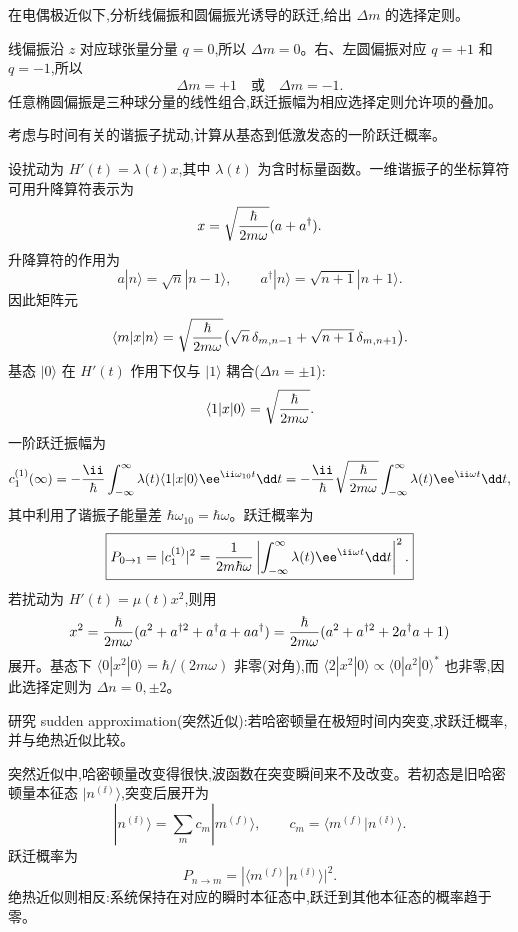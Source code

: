 \begin{question}
在电偶极近似下,分析线偏振和圆偏振光诱导的跃迁,给出 $\Delta m$ 的选择定则。
\end{question}
\begin{solution}
线偏振沿 $z$ 对应球张量分量 $q=0$,所以 $\Delta m=0$。右、左圆偏振对应 $q=+1$ 和 $q=-1$,所以
\[
\Delta m=+1\quad\text{或}\quad \Delta m=-1.
\]
任意椭圆偏振是三种球分量的线性组合,跃迁振幅为相应选择定则允许项的叠加。
\end{solution}

\begin{question}
考虑与时间有关的谐振子扰动,计算从基态到低激发态的一阶跃迁概率。
\end{question}
\begin{solution}
设扰动为 $H'(t)=\lambda(t)x$,其中 $\lambda(t)$ 为含时标量函数。一维谐振子的坐标算符可用升降算符表示为
\[
x=\sqrt{\hbar\over2m\omega}(a+a^\dagger).
\]
升降算符的作用为
\[
a|n\rangle=\sqrt{n}|n-1\rangle,\qquad
a^\dagger|n\rangle=\sqrt{n+1}|n+1\rangle.
\]
因此矩阵元
\[
\langle m|x|n\rangle=\sqrt{\hbar\over2m\omega}
\big(\sqrt{n}\,\delta_{m,n-1}+\sqrt{n+1}\,\delta_{m,n+1}\big).
\]
基态 $|0\rangle$ 在 $H'(t)$ 作用下仅与 $|1\rangle$ 耦合($\Delta n=\pm1$):
\[
\langle1|x|0\rangle=\sqrt{\hbar\over2m\omega}.
\]
一阶跃迁振幅为
\[
c_1^{(1)}(\infty)=-{\ii\over\hbar}\int_{-\infty}^{\infty}\lambda(t)
\langle1|x|0\rangle \ee^{\ii\omega_{10}t}\dd t
=-{\ii\over\hbar}\sqrt{\hbar\over2m\omega}\int_{-\infty}^{\infty}\lambda(t)\ee^{\ii\omega t}\dd t,
\]
其中利用了谐振子能量差 $\hbar\omega_{10}=\hbar\omega$。跃迁概率为
\[
\boxed{P_{0\to1}=|c_1^{(1)}|^2
= {1\over2m\hbar\omega}\left|\int_{-\infty}^{\infty}\lambda(t)\ee^{\ii\omega t}\dd t\right|^2.}
\]
若扰动为 $H'(t)=\mu(t)x^2$,则用
\[
x^2={\hbar\over2m\omega}(a^2+a^{\dagger2}+a^\dagger a+aa^\dagger)
={\hbar\over2m\omega}(a^2+a^{\dagger2}+2a^\dagger a+1)
\]
展开。基态下 $\langle0|x^2|0\rangle=\hbar/(2m\omega)$ 非零(对角),而 $\langle2|x^2|0\rangle\propto\langle0|a^2|0\rangle^*$ 也非零,因此选择定则为 $\Delta n=0,\pm2$。
\end{solution}

\begin{question}
研究 sudden approximation(突然近似):若哈密顿量在极短时间内突变,求跃迁概率,并与绝热近似比较。
\end{question}
\begin{solution}
突然近似中,哈密顿量改变得很快,波函数在突变瞬间来不及改变。若初态是旧哈密顿量本征态 $|n^{(\ii)}\rangle$,突变后展开为
\[
|n^{(\ii)}\rangle=\sum_m c_m|m^{(f)}\rangle,
\qquad
c_m=\langle m^{(f)}|n^{(\ii)}\rangle.
\]
跃迁概率为
\[
\boxed{P_{n\to m}=|\langle m^{(f)}|n^{(\ii)}\rangle|^2.}
\]
绝热近似则相反:系统保持在对应的瞬时本征态中,跃迁到其他本征态的概率趋于零。
\end{solution}

